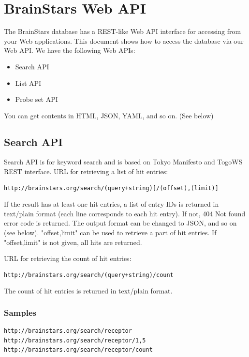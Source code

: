 \documentclass[12pt,fullpage]{article}
\begin{document}
\section{BrainStars Web API} 
The BrainStars database has a REST-like Web API interface for accessing from your Web applications. This document shows how to access the database via our Web API. We have the following Web APIs:

\begin{itemize}
  \item Search API
  \item List API
  \item Probe set API
\end{itemize}

You can get contents in HTML, JSON, YAML, and so on. (See below)

\subsection{Search API}
Search API is for keyword search and is based on Tokyo Manifesto and TogoWS REST interface. URL for retrieving a list of hit entries:

\begin{verbatim}
http://brainstars.org/search/(query+string)[/(offset),(limit)]
\end{verbatim}

If the result has at least one hit entries, a list of entry IDs is returned in text/plain format (each line corresponds to each hit entry). If not, 404 Not found error code is returned. The output format can be changed to JSON, and so on (see below). "offset,limit" can be used to retrieve a part of hit entries. If "offset,limit" is not given, all hits are returned.

URL for retrieving the count of hit entries:
\begin{verbatim}
http://brainstars.org/search/(query+string)/count
\end{verbatim}

The count of hit entries is returned in text/plain format.

\subsubsection{Samples}
\begin{verbatim}
http://brainstars.org/search/receptor
http://brainstars.org/search/receptor/1,5
http://brainstars.org/search/receptor/count
\end{verbatim}
\end{document}

